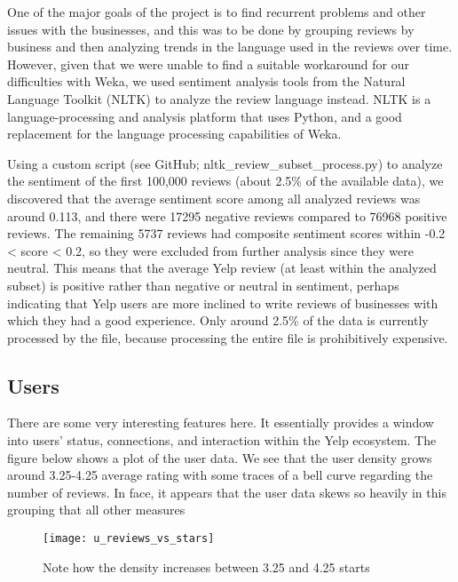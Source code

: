 \quad One of the major goals of the project is to find recurrent problems and other issues with the businesses, and this was to be done by grouping reviews by business and then analyzing trends in the language used in the reviews over time. However, given that we were unable to find a suitable workaround for our difficulties with Weka, we used sentiment analysis tools from the Natural Language Toolkit (NLTK) to analyze the review language instead. NLTK is a language-processing and analysis platform that uses Python, and a good replacement for the language processing capabilities of Weka. 

\quad Using a custom script (see GitHub; nltk\_review\_subset\_process.py) to analyze the sentiment of the first 100,000 reviews (about 2.5\% of the available data), we discovered that the average sentiment score among all analyzed reviews was around 0.113, and there were 17295 negative reviews compared to 76968 positive reviews. The remaining 5737 reviews had composite sentiment scores within -0.2 < score < 0.2, so they were excluded from further analysis since they were neutral. This means that the average Yelp review (at least within the analyzed subset) is positive rather than negative or neutral in sentiment, perhaps indicating that Yelp users are more inclined to write reviews of businesses with which they had a good experience. Only around 2.5\% of the data is currently processed by the file, because processing the entire file is prohibitively expensive.

\subsection{Users}

\quad There are some very interesting features here. It essentially provides a window into users' status, connections, and interaction within the Yelp ecosystem. The figure below shows a plot of the user data. We see that the user density grows around 3.25-4.25 average rating with some traces of a bell curve regarding the number of reviews. In face, it appears that the user data skews so heavily in this grouping that all other measures 

\begin{figure}[!h]
\texttt{[image: u\_reviews\_vs\_stars]}
  \caption{Note how the density increases between 3.25 and 4.25 starts}
  \label{fig:Plot of review count vs average star rating}
\end{figure}

